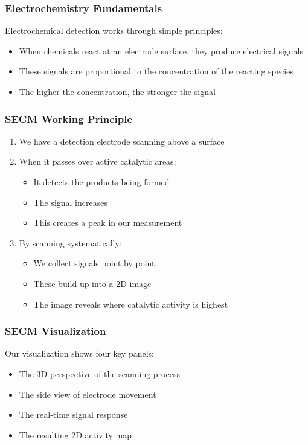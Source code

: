 \documentclass{beamer}
\begin{document}
\begin{frame}
\frametitle{Electrochemistry Fundamentals}
Electrochemical detection works through simple principles:
\begin{itemize}
    \item When chemicals react at an electrode surface, they produce electrical signals
    \item These signals are proportional to the concentration of the reacting species
    \item The higher the concentration, the stronger the signal
\end{itemize}
\end{frame}

\begin{frame}
\frametitle{SECM Working Principle}
\begin{enumerate}
    \item We have a detection electrode scanning above a surface
    \item When it passes over active catalytic areas:
    \begin{itemize}
        \item It detects the products being formed
        \item The signal increases
        \item This creates a peak in our measurement
    \end{itemize}
    \item By scanning systematically:
    \begin{itemize}
        \item We collect signals point by point
        \item These build up into a 2D image
        \item The image reveals where catalytic activity is highest
    \end{itemize}
\end{enumerate}
\end{frame}

\begin{frame}
\frametitle{SECM Visualization}
Our visualization shows four key panels:
\begin{itemize}
    \item The 3D perspective of the scanning process
    \item The side view of electrode movement
    \item The real-time signal response
    \item The resulting 2D activity map
\end{itemize}
\end{frame}
\end{document}
